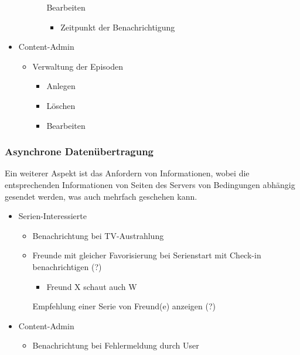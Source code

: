 \documentclass[a4paper]{article}
\begin{document}
\begin{itemize}
\begin{itemize}
\begin{itemize}
   	  	Bearbeiten
   	  		\begin{itemize}
   	  		\item
   	  	    Zeitpunkt der Benachrichtigung
   	  	    \end{itemize}
		\end{itemize}
	\end{itemize}
	\item
	Content-Admin
		\begin{itemize}
		\item
		Verwaltung der Episoden
			\begin{itemize}
			\item
			Anlegen
			\item
			Löschen
			\item
			Bearbeiten
			\end{itemize}
		\end{itemize}
\end{itemize}


\subsubsection{Asynchrone Datenübertragung}

Ein weiterer Aspekt ist das Anfordern von Informationen, wobei die entsprechenden Informationen von Seiten des Servers von Bedingungen abhängig gesendet werden, was auch mehrfach geschehen kann.

\begin{itemize}
\item
Serien-Interessierte
	\begin{itemize}
	\item
    Benachrichtung bei TV-Austrahlung
    \item
    Freunde mit gleicher Favorisierung bei Serienstart mit Check-in benachrichtigen (?)
	    \begin{itemize}
	    \item
         Freund X schaut auch W
         \end{itemize}
    Empfehlung einer Serie von Freund(e) anzeigen (?)
    \end{itemize}
\item
Content-Admin
	\begin{itemize}
	\item
    Benachrichtung bei Fehlermeldung durch User
    \end{itemize}
\end{itemize}
\end{document}
